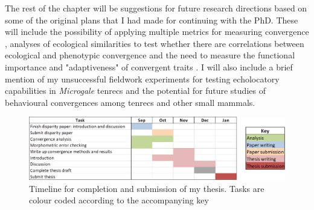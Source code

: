 \documentclass[12pt,a4paper]{article}
\begin{document}
	The rest of the chapter will be suggestions for future research directions based on some of the original plans that I had made for continuing with the PhD. These will include the possibility of applying multiple metrics for measuring convergence \citep[e.g.][]{Ingram2013, Segar2013, Harmon2005}, analyses of ecological similarities to test whether there are correlations between ecological and phenotypic convergence \citep[e.g.][]{Moen2013} and the need to measure the functional importance and "adaptiveness" of convergent traits \citep{Losos2010}. I will also include a brief mention of my unsuccessful fieldwork experiments for testing echolocatory capabilities in \textit{Microgale} tenrecs and the potential for future studies of behavioural convergences among tenrecs and other small mammals.




\begin{landscape}
  \begin{figure}[p]
	\centering
	\includegraphics[keepaspectratio=true]{Gannt_July.png}
	\caption{Timeline for completion and submission of my thesis. Tasks are colour coded according to the accompanying key}
	\label{gantt}
  \end{figure}
\end{landscape}


 
\end{document}
